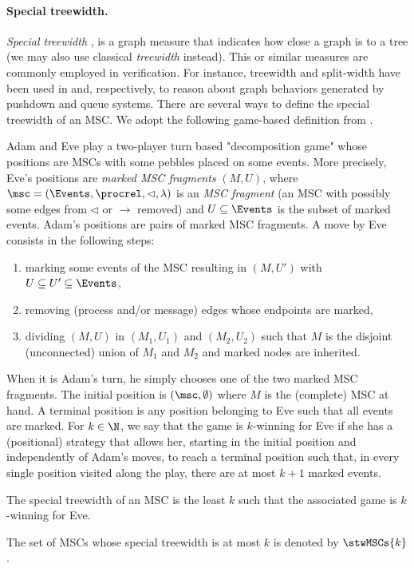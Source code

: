 \paragraph*{Special treewidth.}

\emph{Special treewidth} \cite{Courcelle10},
is a graph measure that indicates how close
a graph is to a tree (we may also use classical
	\emph{treewidth} instead).
This or similar measures are commonly employed in verification. For instance, treewidth and split-width have been used in \cite{MadhusudanP11} and, respectively, \cite{DBLP:conf/concur/CyriacGK12,AiswaryaGK14} to reason about graph behaviors generated by pushdown and queue systems.
There are several ways to define the special treewidth of an MSC.
We adopt the following game-based definition from \cite{DBLP:journals/corr/abs-1904-06942}.

Adam and Eve play a two-player turn based "decomposition game"
whose positions
are MSCs with some pebbles placed on some events.
More precisely, Eve's positions are
\emph{marked MSC fragments} $(M, U)$, where
$\msc = (\Events, \procrel, \lhd, \lambda)$
is an \emph{MSC fragment} (an MSC with possibly some edges from
$\lhd$ or $\to$ removed)
 and $U \subseteq \Events$ is the subset of marked events.
Adam's positions are pairs of marked MSC fragments.
A move by Eve consists in the following steps:
\begin{enumerate}
	\item marking some events of the MSC resulting in $(M, U')$ with $U \subseteq U' \subseteq \Events$,
	\item removing (process and/or message) edges whose endpoints are marked,
	\item dividing $(M, U)$ in $(M_1, U_1)$ and $(M_2, U_2)$ such that $M$ is the disjoint (unconnected) union of $M_1$ and $M_2$
	and marked nodes are inherited.
\end{enumerate}
When it is Adam's turn, he simply chooses one of the two marked MSC fragments.
The initial position is $(\msc,\emptyset)$ where $M$ is the (complete) MSC at hand. A terminal position is any position belonging to Eve such that all events are marked.
%
For $k \in \N$, we say that the game is $k$-winning for Eve if she has a (positional) strategy that allows her,
starting in the initial position and independently of Adam's moves, to reach a terminal position such that, in every single position visited along the play, there are at most $k+1$ marked events.

\newcommand{\CS}[2]{\mathsf{CS}_{(#1,#2)}}
\newcommand{\MSO}[2]{\mathsf{MSO}_{(#1,#2)}}
\newcommand{\LCPDL}[2]{\mathsf{LCPDL}_{(#1,#2)}}
\newcommand{\MSCpm}[2]{\mathsf{MSC}_{(#1,#2)}}
\newcommand{\mbMSCpm}[2]{\mathsf{MSC}_{(#1,#2)}^{\mathsf{mb}}}


\begin{fact}
	The special treewidth of an MSC is the least $k$ such that
	the associated game is $k$-winning for Eve.
\end{fact}

The set of MSCs whose special treewidth is at most $k$ is denoted by $\stwMSCs{k}$.